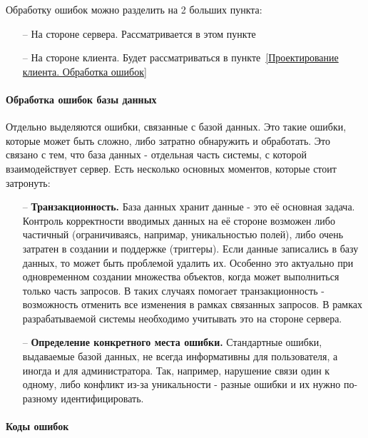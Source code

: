 \documentclass[a4paper,article]{article}
\begin{document}
    Обработку ошибок можно разделить на 2 больших пункта:

    \begin{itemize}[nolistsep]
        \item[--] На стороне сервера. Рассматривается в этом пункте
        \item[--] На стороне клиента. Будет рассматриваться в пункте~\ref{Проектирование клиента. Обработка ошибок}
    \end{itemize}

    \paragraph{Обработка ошибок базы данных}

    Отдельно выделяются ошибки, связанные с базой данных. Это такие ошибки, которые может быть сложно, либо затратно обнаружить и обработать. Это связано с тем, что база данных - отдельная часть системы, с которой взаимодействует сервер. Есть несколько основных моментов, которые стоит затронуть:

    \begin{itemize}[nolistsep]
        \item[--] \textbf{Транзакционность.} База данных хранит данные - это её основная задача. Контроль корректности вводимых данных на её стороне возможен либо частичный (ограничиваясь, напримар, уникальностью полей), либо очень затратен в создании и поддержке (триггеры). Если данные записались в базу данных, то может быть проблемой удалить их. Особенно это актуально при одновременном создании множества объектов, когда может выполниться только часть запросов. В таких случаях помогает транзакционность - возможность отменить все изменения в рамках связанных запросов. В рамках разрабатываемой системы необходимо учитывать это на стороне сервера.
        \item[--] \textbf{Определение конкретного места ошибки.} Стандартные ошибки, выдаваемые базой данных, не всегда информативны для пользователя, а иногда и для администратора. Так, например, нарушение связи один к одному, либо конфликт из-за уникальности - разные ошибки и их нужно по-разному идентифицировать.
    \end{itemize}

    \paragraph{Коды ошибок}\label{Проектирование сервера. Коды ошибок}
\end{document}
